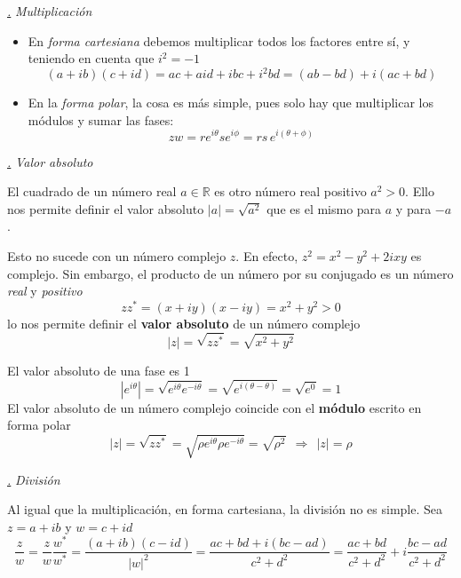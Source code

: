 \documentclass[a4paper,11pt]{book} %
\numberwithin{equation}{chapter}
\def\subsubiContadorIt{\par\addtocounter{subsubsection}{1}\underline{\it\thesubsubsection.}\hskip0.5cm \setcounter{subsubsubsectionIt}{0}}
\newcommand{\SubsubiIt}[1]{
		\subsubiContadorIt \textit{#1}
	}
\newcounter{subsubsubsectionIt}[subsubsection]
\begin{document}
			\SubsubiIt{Multiplicación}

\begin{itemize}
	\item En \textit{forma cartesiana} debemos multiplicar todos los factores entre sí, y teniendo en cuenta que $i^2= -1$
	\begin{equation}
(a + i b) (c + i d) =ac +  ai d +i bc +i^2 bd = (ab - bd) + i(ac + bd)
	\end{equation} 

	\item En la \textit{forma polar}, la cosa es más simple, pues solo hay que multiplicar los módulos y sumar las fases: 
	\begin{equation}
z w = r e^{i\theta} s e^{i\phi} = rs\,   e^{i(\theta + \phi)} 
	\end{equation}
\end{itemize}

			\SubsubiIt{Valor absoluto}

El cuadrado de un número real $a\in {\mathbb R}$ es otro número real positivo $a^2 >0$. Ello nos permite definir
el valor absoluto $|a| = \sqrt{a^2}$ que es el mismo para $a$ y para $-a$.

Esto no sucede con un número complejo $z$. En efecto,  $z^2 = x^2 - y^2 +2i xy$ es complejo. Sin embargo, el producto de un número por su conjugado es un número \textit{real} y \textit{positivo}
$$
z z^*  = (x + i y) (x-i y) = x^2 + y^2 >0
$$
lo nos permite definir el \textbf{valor absoluto} de un número complejo
	\begin{equation}
	\boxed{|z| = \sqrt{z z^*} = \sqrt{x^2 + y^2}}
	\end{equation}

El valor absoluto de una fase es 1
	\begin{equation}
	|e^{i\theta}| = \sqrt{ e^{i\theta}   e^{-i\theta}}=\sqrt{ e^{i(\theta-\theta)}}=\sqrt{e^0} = 1
	\end{equation}
El valor absoluto de un número complejo coincide con el \textbf{módulo} escrito en forma polar
	\begin{equation}
	|z| = \sqrt{zz^*} = \sqrt{\rho e^{i\theta} \rho e^{-i\theta}}=\sqrt{\rho^2} ~~ \Rightarrow ~~ \boxed{|z| = \rho}
	\end{equation}

			
			\SubsubiIt{División}
			
Al igual que la multiplicación, en forma cartesiana, la división no es simple. Sea $z = a+ i b$ y $w=c+i d$ 
	\begin{equation}
	\frac{z}{w} = \frac{z}{w}\frac{w^*}{w^*} = \frac{( a+ i b)(c-i d)}{|w|^2} = \frac{ac+bd + i(bc-ad)}{c^2+d^2}  = \frac{ac+bd}{c^2+d^2} +i\frac{bc-ad}{c^2+d^2}
	\end{equation}
\end{document}
